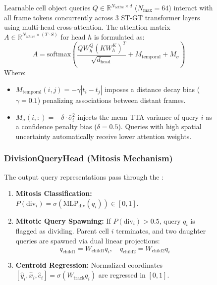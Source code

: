 \documentclass[10pt,journal,compsoc]{IEEEtran}
\begin{document}
\begin{figure}[t]
Learnable cell object queries $Q \in \mathbb{R}^{N_{\text{active}} \times d}$ ($N_{\text{max}}=64$) interact with all frame tokens concurrently across 3 ST-GT transformer layers using multi-head cross-attention. The attention matrix $A \in \mathbb{R}^{N_{\text{active}} \times (T \cdot S)}$ for head $h$ is formulated as:
\begin{equation}
A = \text{softmax}\left( \frac{Q W_h^Q (K W_h^K)^T}{\sqrt{d_{\text{head}}}} + M_{\text{temporal}} + M_{\sigma} \right)
\end{equation}
Where:
\begin{itemize}
    \item $M_{\text{temporal}}(i, j) = -\gamma |t_i - t_j|$ imposes a distance decay bias ($\gamma = 0.1$) penalizing associations between distant frames.
    \item $M_{\sigma}(i, :) = -\delta \cdot \bar{\sigma}_i^2$ injects the mean TTA variance of query $i$ as a confidence penalty bias ($\delta = 0.5$). Queries with high spatial uncertainty automatically receive lower attention weights.
\end{itemize}

\subsubsection{DivisionQueryHead (Mitosis Mechanism)}
The output query representations pass through the :
\begin{enumerate}
    \item \textbf{Mitosis Classification:} $P(\text{div}_i) = \sigma(\text{MLP}_{\text{div}}(q_i)) \in [0, 1]$.
    \item \textbf{Mitotic Query Spawning:} If $P(\text{div}_i) > 0.5$, query $q_i$ is flagged as dividing. Parent cell $i$ terminates, and two daughter queries are spawned via dual linear projections:
    \begin{equation}
    q_{\text{child1}} = W_{\text{child1}} q_i, \quad q_{\text{child2}} = W_{\text{child2}} q_i
    \end{equation}
    \item \textbf{Centroid Regression:} Normalized coordinates $[\hat{y}_i, \hat{x}_i, \hat{c}_i] = \sigma(W_{\text{track}} q_i)$ are regressed in $[0, 1]$.
\end{enumerate}


\end{figure}
\end{document}
